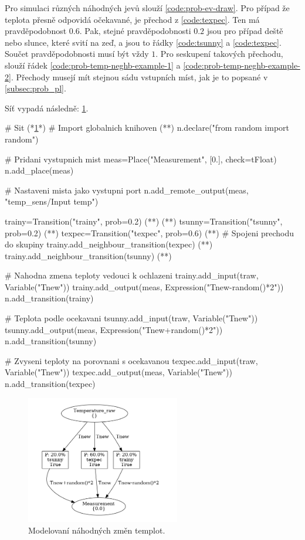 Pro simulaci různých náhodných jevů slouží \ref{code:prob-ev-draw}. Pro případ že teplota přesně odpovidá očekavané, je přechod  z \ref{code:texpec}. Ten má pravděpodobnost $0.6$. Pak, stejné pravděpodobnosti $0.2$ jsou pro případ deště nebo slunce, které svití na zeď, a jsou to řádky \ref{code:tsunny} a \ref{code:texpec}. Součet pravděpodobnosti musí být vždy $1$. Pro seskupení takových přechodu, slouží řádek \ref{code:prob-temp-neghb-example-1} a \ref{code:prob-temp-neghb-example-2}. Přechody musejí mít stejnou sádu vstupních míst, jak je to popsané v \ref{subsec:prob_pl}.

Síť vypadá následně: \ref{prob-ev-viz}.

\begin{python}
  # Sit (*\ref{prob-ev-viz}*)
  # Import globalnich knihoven (*\label{code:prob-ev-draw}*)
  n.declare("from random import random")

  # Pridani vystupnich mist
  meas=Place("Measurement", [0.], check=tFloat)
  n.add_place(meas)

  # Nastaveni mista jako vystupni port
  n.add_remote_output(meas, "temp_sens/Input temp")

  trainy=Transition("trainy", prob=0.2) (*\label{code:prob-temp-example}*) (*\label{code:trainy}*)
  tsunny=Transition("tsunny", prob=0.2) (*\label{code:tsunny}*)
  texpec=Transition("texpec", prob=0.6) (*\label{code:texpec}*)
  # Spojeni prechodu do skupiny
  trainy.add_neighbour_transition(texpec) (*\label{code:prob-temp-neghb-example-1}*)
  trainy.add_neighbour_transition(tsunny) (*\label{code:prob-temp-neghb-example-2}*)

  # Nahodna zmena teploty vedouci k ochlazeni
  trainy.add_input(traw, Variable("Tnew"))
  trainy.add_output(meas, Expression("Tnew-random()*2"))
  n.add_transition(trainy)

  # Teplota podle ocekavani
  tsunny.add_input(traw, Variable("Tnew"))
  tsunny.add_output(meas, Expression("Tnew+random()*2"))
  n.add_transition(tsunny)

  # Zvyseni teploty na porovnani s ocekavanou
  texpec.add_input(traw, Variable("Tnew"))
  texpec.add_output(meas, Variable("Tnew"))
  n.add_transition(texpec)
\end{python}

\begin{figure}[htb]
  \centering
  \includegraphics[width=0.6\textwidth]{obrazky-figures/measure.png}
  \caption{Modelovaní náhodných změn templot.}
  \label{prob-ev-viz}
\end{figure}

